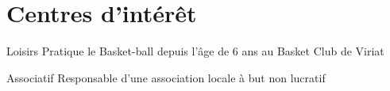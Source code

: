 \documentclass[10pt,a4paper]{moderncv}
\begin{document}

\section{Centres d'intérêt}

\cvline
	{Loisirs}
	{Pratique le Basket-ball depuis l'âge de 6 ans au Basket Club de Viriat}

\cvline
	{Associatif}
	{Responsable d'une association locale à but non lucratif}

\end{document}
